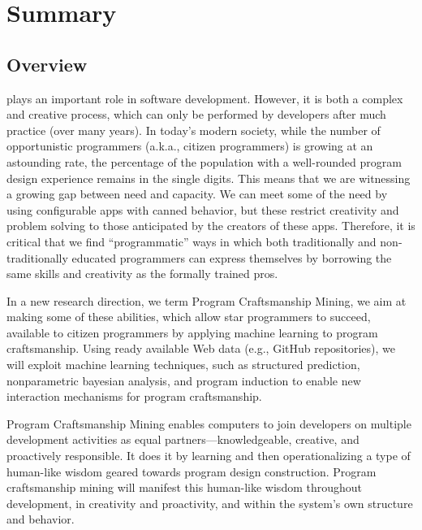 \chapter{Summary}{}
\label{sec:intro}

\section*{Overview} %
\label{sec:overview}

 plays an important role in software development. 
However, it is both a complex and creative process, which can only be performed 
by developers after much practice (over many years). In today’s modern society, 
while the number of opportunistic programmers (a.k.a., citizen programmers) is 
growing at an astounding rate, the percentage of the population with a well-rounded 
program design experience remains in the single digits. This means that we are 
witnessing a growing gap between need and capacity. We can meet some of the need 
by using configurable apps with canned behavior, but these restrict creativity and 
problem solving to those anticipated by the creators of these apps. Therefore, it 
is critical that we find ``programmatic'' ways in which both traditionally and 
non-traditionally educated programmers can express themselves by borrowing the 
same skills and creativity as the formally trained pros.

In a new research direction, we term Program Craftsmanship Mining, we aim at 
making some of these abilities, which allow star programmers to succeed, available 
to citizen programmers by applying machine learning to program craftsmanship. Using 
ready available Web data (e.g., GitHub repositories), we will exploit machine 
learning techniques, such as structured prediction, nonparametric bayesian 
analysis, and program induction to enable new interaction mechanisms for program 
craftsmanship.

Program Craftsmanship Mining enables computers to join developers on multiple 
development activities as equal partners—knowledgeable, creative, and proactively 
responsible. It does it by learning and then operationalizing a type of human-like 
wisdom geared towards program design construction. Program craftsmanship mining will 
manifest this human-like wisdom throughout development, in creativity and 
proactivity, and within the system's own structure and behavior. 


